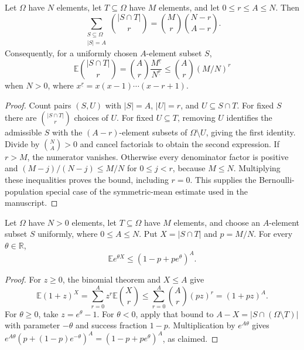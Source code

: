 \begin{lemma}
\label{lem:sampling-binomial-moments}
\leanok
Let $\Omega$ have $N$ elements, let $T\subseteq\Omega$ have $M$
elements, and let $0\leq r\leq A\leq N$. Then
\[
 \sum_{\substack{S\subseteq\Omega\\|S|=A}}
   \binom{|S\cap T|}{r}
 =\binom Mr\binom{N-r}{A-r}.
\]
Consequently, for a uniformly chosen $A$-element subset $S$,
\[
 \mathbb E\binom{|S\cap T|}{r}
 =\binom Ar\frac{M^{\underline r}}{N^{\underline r}}
 \leq\binom Ar(M/N)^r
\]
when $N>0$, where $x^{\underline r}=x(x-1)\cdots(x-r+1)$.
\end{lemma}
\begin{proof}
Count pairs $(S,U)$ with $|S|=A$, $|U|=r$, and $U\subseteq S\cap T$.
For fixed $S$ there are $\binom{|S\cap T|}{r}$ choices of $U$.
For fixed $U\subseteq T$, removing $U$ identifies the admissible $S$
with the $(A-r)$-element subsets of $\Omega\setminus U$, giving the
first identity. Divide by $\binom NA>0$ and cancel factorials to
obtain the second expression. If $r>M$, the numerator vanishes.
Otherwise every denominator factor is positive and
$(M-j)/(N-j)\leq M/N$ for $0\leq j<r$, because $M\leq N$.
Multiplying these inequalities proves the bound, including $r=0$.
This supplies the Bernoulli-population special case of the symmetric-mean
estimate used in the manuscript.
\end{proof}

\begin{lemma}
\label{lem:sampling-exponential-moment}
\leanok
Let $\Omega$ have $N>0$ elements, let $T\subseteq\Omega$ have $M$
elements, and choose an $A$-element subset $S$ uniformly, where
$0\leq A\leq N$. Put $X=|S\cap T|$ and $p=M/N$. For every
$\theta\in\mathbb R$,
\[
 \mathbb E e^{\theta X}\leq(1-p+pe^\theta)^A.
\]
\end{lemma}
\begin{proof}
For $z\geq0$, the binomial theorem and $X\leq A$ give
\[
 \mathbb E(1+z)^X=\sum_{r=0}^A z^r\mathbb E\binom Xr
 \leq\sum_{r=0}^A\binom Ar(pz)^r=(1+pz)^A.
\]
For $\theta\geq0$, take $z=e^\theta-1$. For $\theta<0$,
apply that bound to $A-X=|S\cap(\Omega\setminus T)|$ with
parameter $-\theta$ and success fraction $1-p$. Multiplication by
$e^{A\theta}$ gives
$e^{A\theta}(p+(1-p)e^{-\theta})^A=(1-p+pe^\theta)^A$,
as claimed.
\end{proof}

